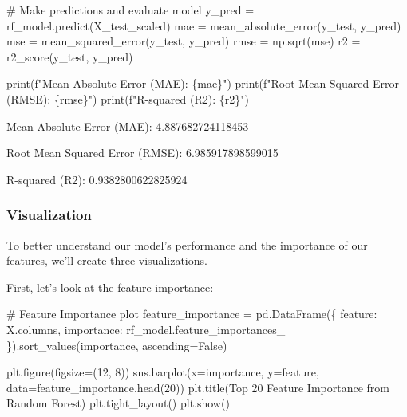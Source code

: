 \documentclass[
  letterpaper,
  DIV=11,
  numbers=noendperiod]{scrartcl}
\newenvironment{Shaded}{\begin{snugshade}}{\end{snugshade}}
\newcommand{\BuiltInTok}[1]{\textcolor[rgb]{0.00,0.23,0.31}{#1}}
\newcommand{\CommentTok}[1]{\textcolor[rgb]{0.37,0.37,0.37}{#1}}
\newcommand{\DecValTok}[1]{\textcolor[rgb]{0.68,0.00,0.00}{#1}}
\newcommand{\NormalTok}[1]{\textcolor[rgb]{0.00,0.23,0.31}{#1}}
\newcommand{\OperatorTok}[1]{\textcolor[rgb]{0.37,0.37,0.37}{#1}}
\newcommand{\SpecialCharTok}[1]{\textcolor[rgb]{0.37,0.37,0.37}{#1}}
\newcommand{\SpecialStringTok}[1]{\textcolor[rgb]{0.13,0.47,0.30}{#1}}
\newcommand{\StringTok}[1]{\textcolor[rgb]{0.13,0.47,0.30}{#1}}
\newcommand{\VariableTok}[1]{\textcolor[rgb]{0.07,0.07,0.07}{#1}}
\begin{document}
\begin{Shaded}
\begin{Highlighting}[]
\CommentTok{\# Make predictions and evaluate model}
\NormalTok{y\_pred }\OperatorTok{=}\NormalTok{ rf\_model.predict(X\_test\_scaled)}
\NormalTok{mae }\OperatorTok{=}\NormalTok{ mean\_absolute\_error(y\_test, y\_pred)}
\NormalTok{mse }\OperatorTok{=}\NormalTok{ mean\_squared\_error(y\_test, y\_pred)}
\NormalTok{rmse }\OperatorTok{=}\NormalTok{ np.sqrt(mse)}
\NormalTok{r2 }\OperatorTok{=}\NormalTok{ r2\_score(y\_test, y\_pred)}

\BuiltInTok{print}\NormalTok{(}\SpecialStringTok{f"Mean Absolute Error (MAE): }\SpecialCharTok{\{}\NormalTok{mae}\SpecialCharTok{\}}\SpecialStringTok{"}\NormalTok{)}
\BuiltInTok{print}\NormalTok{(}\SpecialStringTok{f"Root Mean Squared Error (RMSE): }\SpecialCharTok{\{}\NormalTok{rmse}\SpecialCharTok{\}}\SpecialStringTok{"}\NormalTok{)}
\BuiltInTok{print}\NormalTok{(}\SpecialStringTok{f"R{-}squared (R2): }\SpecialCharTok{\{}\NormalTok{r2}\SpecialCharTok{\}}\SpecialStringTok{"}\NormalTok{)}
\end{Highlighting}
\end{Shaded}

Mean Absolute Error (MAE): 4.887682724118453

Root Mean Squared Error (RMSE): 6.985917898599015

R-squared (R2): 0.9382800622825924

\subsubsection{Visualization}\label{sec-visualization}

To better understand our model's performance and the importance of our
features, we'll create three visualizations.

First, let's look at the feature importance:

\begin{Shaded}
\begin{Highlighting}[]
\CommentTok{\# Feature Importance plot}
\NormalTok{feature\_importance }\OperatorTok{=}\NormalTok{ pd.DataFrame(\{}
    \StringTok{\textquotesingle{}feature\textquotesingle{}}\NormalTok{: X.columns,}
    \StringTok{\textquotesingle{}importance\textquotesingle{}}\NormalTok{: rf\_model.feature\_importances\_}
\NormalTok{\}).sort\_values(}\StringTok{\textquotesingle{}importance\textquotesingle{}}\NormalTok{, ascending}\OperatorTok{=}\VariableTok{False}\NormalTok{)}

\NormalTok{plt.figure(figsize}\OperatorTok{=}\NormalTok{(}\DecValTok{12}\NormalTok{, }\DecValTok{8}\NormalTok{))}
\NormalTok{sns.barplot(x}\OperatorTok{=}\StringTok{\textquotesingle{}importance\textquotesingle{}}\NormalTok{, y}\OperatorTok{=}\StringTok{\textquotesingle{}feature\textquotesingle{}}\NormalTok{, data}\OperatorTok{=}\NormalTok{feature\_importance.head(}\DecValTok{20}\NormalTok{))}
\NormalTok{plt.title(}\StringTok{\textquotesingle{}Top 20 Feature Importance from Random Forest\textquotesingle{}}\NormalTok{)}
\NormalTok{plt.tight\_layout()}
\NormalTok{plt.show()}
\end{Highlighting}
\end{Shaded}
\end{document}
